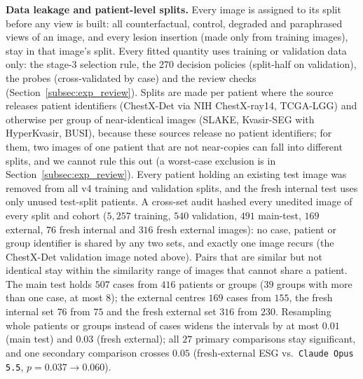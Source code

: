 \documentclass[5p,times,twocolumn,authoryear]{elsarticle}
\begin{document}
\textbf{Data leakage and patient-level splits.} Every image is assigned to its split before any view is built: all counterfactual, control, degraded and paraphrased views of an image, and every lesion insertion (made only from training images), stay in that image's split. Every fitted quantity uses training or validation data only: the stage-3 selection rule, the 270 decision policies (split-half on validation), the probes (cross-validated by case) and the review checks (Section~\ref{subsec:exp_review}). Splits are made per patient where the source releases patient identifiers (ChestX-Det via NIH ChestX-ray14, TCGA-LGG) and otherwise per group of near-identical images (SLAKE, Kvasir-SEG with HyperKvasir, BUSI), because these sources release no patient identifiers; for them, two images of one patient that are not near-copies can fall into different splits, and we cannot rule this out (a worst-case exclusion is in Section~\ref{subsec:exp_review}). Every patient holding an existing test image was removed from all v4 training and validation splits, and the fresh internal test uses only unused test-split patients. A cross-set audit hashed every unedited image of every split and cohort ($5{,}257$ training, $540$ validation, $491$ main-test, $169$ external, $76$ fresh internal and $316$ fresh external images): no case, patient or group identifier is shared by any two sets, and exactly one image recurs (the ChestX-Det validation image noted above). Pairs that are similar but not identical stay within the similarity range of images that cannot share a patient. The main test holds $507$ cases from $416$ patients or groups ($39$ groups with more than one case, at most $8$); the external centres $169$ cases from $155$, the fresh internal set $76$ from $75$ and the fresh external set $316$ from $230$. Resampling whole patients or groups instead of cases widens the intervals by at most $0.01$ (main test) and $0.03$ (fresh external); all $27$ primary comparisons stay significant, and one secondary comparison crosses $0.05$ (fresh-external ESG vs.\ \texttt{Claude Opus 5.5}, $p = 0.037 \to 0.060$).
\end{document}
